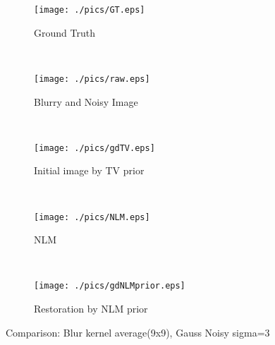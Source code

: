 \documentclass[paper=a4, fontsize=11pt]{scrartcl}
\begin{document}
\begin{figure}[ht]
    \centering
    \begin{subfigure}[b]{0.3\textwidth}
        \texttt{[image: ./pics/GT.eps]}
        \caption{Ground Truth}
    \end{subfigure}
    ~ %
    \begin{subfigure}[b]{0.3\textwidth}
        \texttt{[image: ./pics/raw.eps]}
        \caption{Blurry and Noisy Image}
    \end{subfigure}
    \\
    \begin{subfigure}[b]{0.3\textwidth}
        \texttt{[image: ./pics/gdTV.eps]}
        \caption{Initial image by TV prior}
    \end{subfigure}
    ~
    \begin{subfigure}[b]{0.3\textwidth}
        \texttt{[image: ./pics/NLM.eps]}
        \caption{NLM}
    \end{subfigure}
    ~
    \begin{subfigure}[b]{0.3\textwidth}
        \texttt{[image: ./pics/gdNLMprior.eps]}
        \caption{Restoration by NLM prior}
    \end{subfigure}
    \caption{Comparison: Blur kernel average(9x9), Gauss Noisy sigma=3}
\end{figure}
\end{document}
